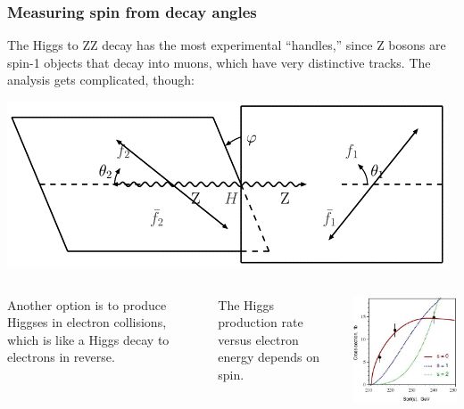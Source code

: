 \documentclass[compress]{beamer}
\begin{document}
\begin{frame}
\frametitle{Measuring spin from decay angles}

The Higgs to ZZ decay has the most experimental ``handles,'' since Z bosons are spin-1 objects that decay into muons, which have very distinctive tracks.  The analysis gets complicated, though:
\begin{center}
\includegraphics[width=0.5\linewidth]{HZZspins.png}
\end{center}

\vfill
\begin{columns}
Another option is to produce Higgses in electron collisions, which is like a Higgs decay to electrons in reverse.

\vspace{0.2 cm}
The Higgs production rate versus electron energy depends on spin.

\includegraphics[width=\linewidth]{ILCspin.jpg}
\end{columns}
\end{frame}
\end{document}
